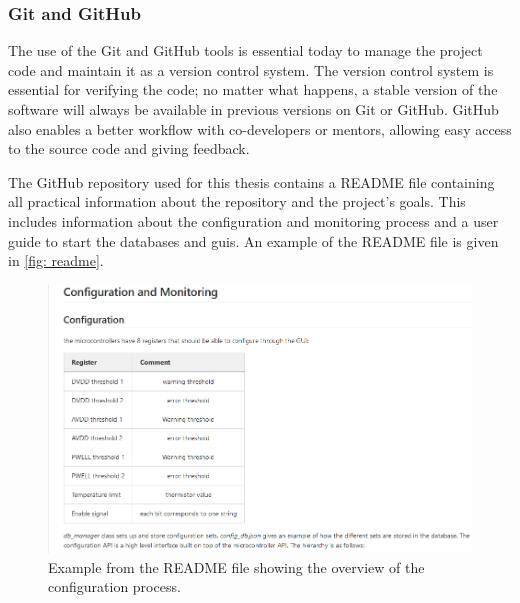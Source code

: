 \documentclass[main.tex]{subfiles}
\begin{document}
\subsubsection{Git and GitHub}
The use of the Git and GitHub tools is essential today to manage the project code and maintain it as a version control system. The version control system is essential for verifying the code; no matter what happens, a stable version of the software will always be available in previous versions on Git or GitHub. GitHub also enables a better workflow with co-developers or mentors, allowing easy access to the source code and giving feedback. 

The GitHub repository used for this thesis contains a README file containing all practical information about the repository and the project's goals. This includes information about the configuration and monitoring process and a user guide to start the databases and \gls{gui}s. An example of the README file is given in \autoref{fig: readme}.


\begin{figure}[!ht]
    \centering
    \includegraphics[width=14cm]{images/README_example.png}
    \caption{Example from the README file showing the overview of the configuration process.}
    \label{fig: readme}
\end{figure}
\FloatBarrier
\end{document}

